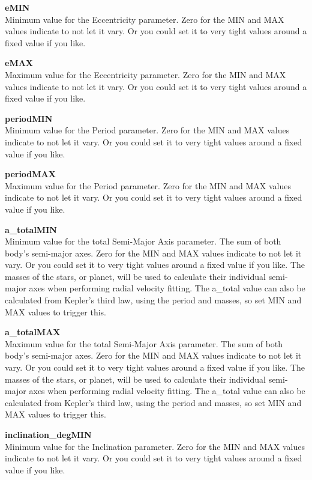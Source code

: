 \documentclass[12pt,preprint]{aastex}
\begin{document}
{\bf eMIN}\\
Minimum value for the Eccentricity parameter.
Zero for the MIN and MAX values indicate to not let it vary.  Or you could set it to very tight values around a fixed value if you like.

{\bf eMAX}\\
Maximum value for the Eccentricity parameter.
Zero for the MIN and MAX values indicate to not let it vary.  Or you could set it to very tight values around a fixed value if you like.

{\bf periodMIN}\\
Minimum value for the Period parameter.
Zero for the MIN and MAX values indicate to not let it vary.  Or you could set it to very tight values around a fixed value if you like.

{\bf periodMAX}\\
Maximum value for the Period parameter.
Zero for the MIN and MAX values indicate to not let it vary.  Or you could set it to very tight values around a fixed value if you like.

{\bf a\_totalMIN}\\
Minimum value for the total Semi-Major Axis parameter.  The sum of both body's semi-major axes.
Zero for the MIN and MAX values indicate to not let it vary.  Or you could set it to very tight values around a fixed value if you like.  The masses of the stars, or planet, will be used to calculate their individual semi-major axes when performing radial velocity fitting.  The a\_total value can also be calculated from Kepler's third law, using the period and masses, so set MIN and MAX values to trigger this. 

{\bf a\_totalMAX}\\
Maximum value for the total Semi-Major Axis parameter.  The sum of both body's semi-major axes.
Zero for the MIN and MAX values indicate to not let it vary.  Or you could set it to very tight values around a fixed value if you like.  The masses of the stars, or planet, will be used to calculate their individual semi-major axes when performing radial velocity fitting.  The a\_total value can also be calculated from Kepler's third law, using the period and masses, so set MIN and MAX values to trigger this. 

{\bf inclination\_degMIN}\\
Minimum value for the Inclination parameter.
Zero for the MIN and MAX values indicate to not let it vary.  Or you could set it to very tight values around a fixed value if you like.
\end{document}
